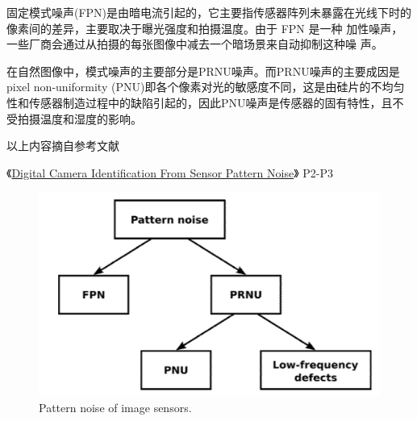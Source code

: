 \documentclass[a4paper,11pt]{article}
\begin{document}
固定模式噪声(FPN)是由暗电流引起的，它主要指传感器阵列未暴露在光线下时的像素间的差异，主要取决于曝光强度和拍摄温度。由于 FPN 是一种 加性噪声，一些厂商会通过从拍摄的每张图像中减去一个暗场景来自动抑制这种噪 声。

在自然图像中，模式噪声的主要部分是PRNU噪声。而PRNU噪声的主要成因是pixel non-uniformity (PNU)即各个像素对光的敏感度不同，这是由硅片的不均匀性和传感器制造过程中的缺陷引起的，因此PNU噪声是传感器的固有特性，且不受拍摄温度和湿度的影响。

以上内容摘自参考文献

《\href{https://www.researchgate.net/publication/3455253_Digital_Camera_Identification_From_Sensor_Pattern_Noise?enrichId=rgreq-d1a8e8e6a055ab936531c60ca2752109-XXX&enrichSource=Y292ZXJQYWdlOzM0NTUyNTM7QVM6MjMxNTYwMjQyNzkwNDAwQDE0MzIyMTk2NzIyMjg\%3D&el=1_x_3&_esc=publicationCoverPdf}{Digital Camera Identification From Sensor Pattern Noise}》 P2-P3
\begin{figure}[!htbp]
	\centering
	\includegraphics[scale=0.3]{noise.png}
	\caption{Pattern noise of image sensors.}
	\label{fig:noise}
\end{figure}
\end{document}
